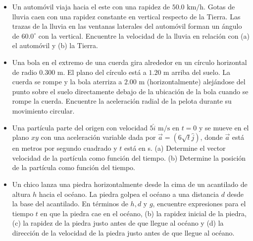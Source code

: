 \documentclass[11pt,a4paper]{article}
\begin{document}
\begin{itemize}
    \item[\textbf{9.}] Un automóvil viaja hacia el este con una rapidez de $50.0 \text{ km/h}$. Gotas de lluvia caen con una rapidez constante en vertical respecto de la Tierra. Las trazas de la lluvia en las ventanas laterales del automóvil forman un ángulo de $60.0^\circ$ con la vertical. Encuentre la velocidad de la lluvia en relación con (a) el automóvil y (b) la Tierra.
    \vspace*{6cm}

    \item[\textbf{10.}] Una bola en el extremo de una cuerda gira alrededor en un círculo horizontal de radio $0.300 \text{ m}$. El plano del círculo está a $1.20 \text{ m}$ arriba del suelo. La cuerda se rompe y la bola aterriza a $2.00 \text{ m}$ (horizontalmente) alejándose del punto sobre el suelo directamente debajo de la ubicación de la bola cuando se rompe la cuerda. Encuentre la aceleración radial de la pelota durante su movimiento circular.
    \vspace*{6cm}

    \item[\textbf{11.}] Una partícula parte del origen con velocidad $5\hat{i} \text{ m/s}$ en $t = 0$ y se mueve en el plano $xy$ con una aceleración variable dada por $\vec{a} = (6\sqrt{t}\hat{j})$, donde $\vec{a}$ está en metros por segundo cuadrado y $t$ está en s. (a) Determine el vector velocidad de la partícula como función del tiempo. (b) Determine la posición de la partícula como función del tiempo.
    \vspace*{6cm}

    \item[\textbf{12.}] Un chico lanza una piedra horizontalmente desde la cima de un acantilado de altura $h$ hacia el océano. La piedra golpea el océano a una distancia $d$ desde la base del acantilado. En términos de $h, d$ y $g$, encuentre expresiones para el tiempo $t$ en que la piedra cae en el océano, (b) la rapidez inicial de la piedra, (c) la rapidez de la piedra justo antes de que llegue al océano y (d) la dirección de la velocidad de la piedra justo antes de que llegue al océano.
    \vspace*{8cm}
\end{itemize}

\newpage
\end{document}
